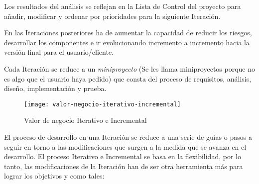 \par Los resultados del análisis se reflejan en la Lista de Control del proyecto para añadir, modificar y ordenar por prioridades para la siguiente Iteración.

\par En las Iteraciones posteriores ha de aumentar la capacidad de reducir los riesgos, desarrollar los componentes e ir evolucionando incremento a incremento hacia la versión final para el usuario/cliente.

\par Cada Iteración se reduce a un \emph{miniproyecto} (Se les llama miniproyectos porque no es algo que el usuario haya pedido) que consta del proceso de requisitos, análisis, diseño, implementación y prueba.

\begin{figure}[H]
    \centering
    \texttt{[image: valor-negocio-iterativo-incremental]}
    \caption{Valor de negocio Iterativo e Incremental}
    \label{fig:valor-negocio-iterativo-incremental}
\end{figure}

\par El proceso de desarrollo en una Iteración se reduce a una serie de guías o pasos a seguir en torno a las modificaciones que surgen a la medida que se avanza en el desarrollo. El proceso Iterativo e Incremental se basa en la flexibilidad, por lo tanto, las modificaciones de la Iteración han de ser otra herramienta más para lograr los objetivos y como tales:

